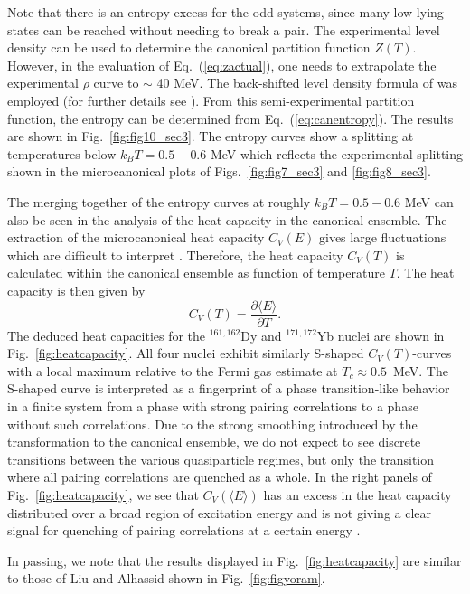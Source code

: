 \documentclass[rmp,preprint,aps,floatfix]{revtex4}
\begin{document}
Note that there is an entropy excess 
for the odd systems, since many low-lying
states can be reached without needing to break a pair.
The experimental level density can be used to determine the canonical 
partition function $Z(T)$. However, in the evaluation of 
Eq.\ (\ref{eq:zactual}), one needs  to extrapolate the 
experimental $\rho$ curve to $\sim$ 40 MeV. The 
back-shifted level density formula of \cite{back_shift,esb88} 
was employed (for further details see \cite{andreas2000}).
From this semi-experimental partition function, the 
entropy can be determined from Eq.\ (\ref{eq:canentropy}). The results 
are shown in Fig.\ \ref{fig:fig10_sec3}. The entropy curves show 
a splitting at temperatures below  $k_BT = 0.5 - 0.6$ MeV 
which reflects the experimental splitting shown in the microcanonical 
plots of Figs.~\ref{fig:fig7_sec3}  and \ref{fig:fig8_sec3}. 


The merging together of the entropy curves at roughly
$k_BT = 0.5 - 0.6$ MeV can also be seen in the analysis of the 
heat capacity in the canonical ensemble.  
The extraction of the microcanonical heat capacity $C_V(E)$ gives large 
fluctuations which are difficult to interpret \cite{oslo3}. Therefore, the heat 
capacity $C_V(T)$ is calculated within the canonical ensemble as function of
temperature $T$. The heat 
capacity is then given by 
\begin{equation}
C_V(T)=\frac{\partial\langle E\rangle}{\partial T}.
\end{equation}
The deduced heat capacities for the $^{161,162}$Dy and $^{171,172}$Yb nuclei 
are shown in Fig.~\ref{fig:heatcapacity}. All four nuclei exhibit similarly 
S-shaped $C_V(T)$-curves with a local maximum relative to the Fermi gas 
estimate at $T_c\approx 0.5$~MeV. The S-shaped curve is interpreted as a 
fingerprint of a phase transition-like behavior in a 
finite system from a phase with strong 
pairing correlations to a phase without such correlations. Due to the strong 
smoothing introduced by the transformation to the canonical ensemble, we do not
expect to see discrete transitions between the various quasiparticle regimes, 
but only the transition where all pairing correlations are quenched as a whole.
In the right panels of Fig.~\ref{fig:heatcapacity}, we see that 
$C_V(\langle E\rangle)$ has an excess in the heat capacity distributed over 
a broad region of excitation energy and is not giving a clear signal for 
quenching of pairing correlations at a certain energy \cite{oslo3}. 


In passing, we note that the results displayed in Fig.~\ref{fig:heatcapacity}
are similar to those of Liu and Alhassid \cite{liu01} 
shown in Fig.~\ref{fig:figyoram}.
\end{document}
